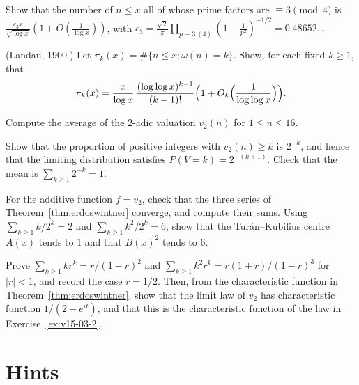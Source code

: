 \begin{exercise}[$\star\star$]\label{ex:onlythree}
Show that the number of $n\le x$ all of whose prime factors are $\equiv3\pmod4$ is $\frac{c_3x}{\sqrt{\log x}}(1+O(\frac1{\log x}))$, with $c_3=\frac{\sqrt2}\pi\prod_{p\equiv3\ (4)}(1-\frac1{p^2})^{-1/2}=0.48652\ldots$
\end{exercise}

\begin{exercise}[$\star\star\star$]\label{ex:landaupik}
(Landau, 1900.) Let $\pi_k(x)=\#\{n\le x:\omega(n)=k\}$. Show, for each fixed $k\ge1$, that
\[
\pi_k(x)=\frac x{\log x}\,\frac{(\log\log x)^{k-1}}{(k-1)!}\Bigl(1+O_k\Bigl(\frac1{\log\log x}\Bigr)\Bigr).
\]
\end{exercise}

\begin{exercise}[$\star$]\label{ex:v15-03-1}
Compute the average of the \(2\)-adic valuation \(v_2(n)\) for \(1\le n\le16\).
\end{exercise}

\begin{exercise}[$\star$]\label{ex:v15-03-2}
Show that the proportion of positive integers with \(v_2(n)\ge k\) is \(2^{-k}\), and hence that the limiting distribution satisfies \(P(V=k)=2^{-(k+1)}\). Check that the mean is \(\sum_{k\ge1}2^{-k}=1\).
\end{exercise}

\begin{exercise}[$\star\star$]\label{ex:v15-03-3}
For the additive function \(f=v_2\), check that the three series of Theorem~\ref{thm:erdoswintner} converge, and compute their sums. Using \(\sum_{k\ge1}k/2^k=2\) and \(\sum_{k\ge1}k^2/2^k=6\), show that the Tur\'an--Kubilius centre \(A(x)\) tends to \(1\) and that \(B(x)^2\) tends to \(6\).
\end{exercise}

\begin{exercise}[$\star\star\star$]\label{ex:v15-03-4}
Prove \(\sum_{k\ge1}kr^k=r/(1-r)^2\) and \(\sum_{k\ge1}k^2r^k=r(1+r)/(1-r)^3\) for \(|r|<1\), and record the case \(r=1/2\). Then, from the characteristic function in Theorem~\ref{thm:erdoswintner}, show that the limit law of \(v_2\) has characteristic function \(1/(2-e^{it})\), and that this is the characteristic function of the law in Exercise~\ref{ex:v15-03-2}.
\end{exercise}

\section{Hints}

